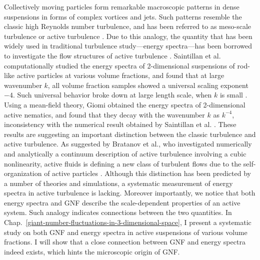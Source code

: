 Collectively moving particles form remarkable macroscopic patterns in dense suspensions in forms of complex vortices and jets. Such patterns resemble the classic high Reynolds number turbulence, and has been referred to as meso-scale turbulence or active turbulence \cite{Wensink2012}. Due to this analogy, the quantity that has been widely used in traditional turbulence study---energy spectra---has been borrowed to investigate the flow structures of active turbulence
\cite{Ishikawa2011, Saintillan2012, Bratanov2015, Giomi2015, Bardfalvy2019, Linkmann2019, Chatterjee2019, Skultety2020, Peng2020}.
Saintillan et al. computationally studied the energy spectra of 2-dimensional suspensions of rod-like active particles at various volume fractions, and found that at large wavenumber $k$, all volume fraction samples showed a universal scaling exponent $-4$. Such universal behavior broke down at large length scale, when $k$ is small \cite{Saintillan2012}.
Using a mean-field theory, Giomi obtained the energy spectra of 2-dimensional active nematics, and found that they decay with the wavenumber $k$ as $k^{-4}$, inconsistency with the numerical result obtained by Saintillan et al. \cite{Giomi2015}.
These results are suggesting an important distinction between the classic turbulence and active turbulence.
As suggested by Bratanov et al., who investigated numerically and analytically a continuum description of active turbulence involving a cubic nonlinearity, active fluids is defining a new class of turbulent flows due to the self-organization of active particles \cite{Bratanov2015}.
Although this distinction has been predicted by a number of theories and simulations, a systematic measurement of energy spectra in active turbulence is lacking.
Moreover importantly, we notice that both energy spectra and GNF describe the scale-dependent properties of an active system. Such analogy indicates connections between the two quantities.
In Chap.~\ref{giant-number-fluctuations-in-3-dimensional-space}, I present a systematic study on both GNF and energy spectra in active suspensions of various volume fractions. I will show that a close connection between GNF and energy spectra indeed exists, which hints the microscopic origin of GNF.




